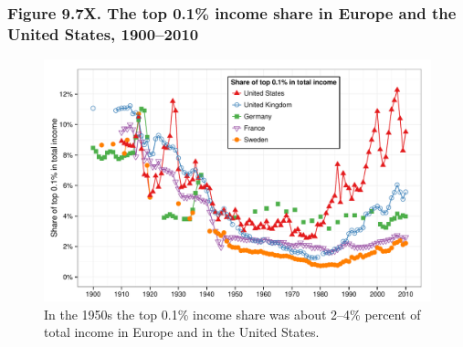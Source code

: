 \documentclass[t]{beamer}\usepackage[]{graphicx}\usepackage[]{color}
\newenvironment{knitrout}{}{} %
\begin{document}
\begin{frame}[label=Figure_9_7X]
\frametitle{Figure 9.7X. The top 0.1\% income share in Europe and the United States, 1900--2010}
\begin{figure}[t]
\begin{minipage}[b]{\textwidth}
\centering
\begin{knitrout}\footnotesize
{}\color{fgcolor}

{\centering \includegraphics[width=1\linewidth]{figures/color/Figure_9_7X} 

}



\end{knitrout}
\caption{In the 1950s the top 0.1\% income share was about 2--4\% percent of total income in Europe and in the United States.}
\end{minipage}
\end{figure}
\end{frame}
\end{document}
